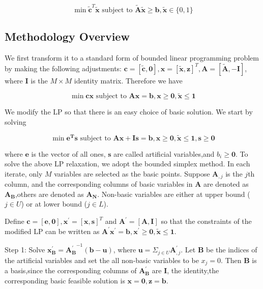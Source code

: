 \documentclass{article}
\begin{document}
\begin{equation*}
\min \tilde{\mathbf{c}}^T\tilde{\mathbf{x}}\textrm{ subject to } \tilde{\mathbf{A}}\tilde{\mathbf{x}}\geq \mathbf{b}, \tilde{\mathbf{x}}\in \{0,1\}
\end{equation*}

\subsection{Methodology Overview}
We first transform it to a standard form of bounded linear programming problem by making the following adjustments: $\mathbf{c}=[\tilde{\mathbf{c}},\mathbf{0}],\mathbf{x}=[\tilde{\mathbf{x}},\mathbf{z}]^T,\mathbf{A}=[\tilde{\mathbf{A}},-\mathbf{I}]$, where $\mathbf{I}$ is the $M\times M$ identity matrix. Therefore we have

\begin{equation}
\min \mathbf{cx} \textrm{ subject to } \mathbf{Ax} = \mathbf{b}, \mathbf{x}\geq \mathbf{0},\tilde{\mathbf{x}} \leq \mathbf{1}
\end{equation}

We modify the LP so that there is an easy choice of basic solution. We start by solving

\begin{equation}
\min \mathbf{e^{T}s} \textrm{ subject to } \mathbf{Ax} + \mathbf{Is} = \mathbf{b}, \mathbf{x}\geq \mathbf{0},\tilde{\mathbf{x}} \leq \mathbf{1},\mathbf{s}\geq \mathbf{0}
\end{equation}

where $\mathbf{e}$ is the vector of all ones, $\mathbf{s}$ are called artificial variables,and $b_{i}\geq \mathbf{0}$.
To solve the above LP relaxation, we adopt the bounded simplex method. In each iterate, only $M$ variables are selected as the basic points. Suppose $\mathbf{A}_{,j}$ is the $j$th column, and the corresponding columns of basic variables in $\mathbf{A}$ are denoted as $\mathbf{A_B}$,others are denoted as $\mathbf{A_N}$. Non-basic variables are either at upper bound ($j \in U$) or at lower bound ($j\in L$).

Define $\mathbf{c}=[\mathbf{e},\mathbf{0}], \mathbf{x}^{'} = [\mathbf{x},\mathbf{s}]^T$ and $\mathbf{A}^{'} = [\mathbf{A},\mathbf{I}]$ so that the constraints of the modified LP can be written as $\mathbf{A}^{'}\mathbf{x}^{'} = \mathbf{b}, \mathbf{x}^{'} \geq \mathbf{0},\tilde{\mathbf{x}} \leq \mathbf{1}$.

Step 1: Solve $\mathbf{x_B^{'}} = \mathbf{A_B^{'}}^{-1}(\mathbf{b} - \mathbf{u})$, where $\mathbf{u} = \Sigma_{j\in U} \mathbf{A}_{,j}^{'}$.
Let $\mathbf{B}$ be the indices of the artificial variables and set the all non-basic variables to be $x_j=0$. Then $\mathbf{B}$ is a basis,since the corresponding columns of $\mathbf{A_B^{'}}$ are $\mathbf{I}$, the identity,the corresponding basic feasible solution is $\mathbf{x} = \mathbf{0}, \mathbf{z} = \mathbf{b}$.
\end{document}

